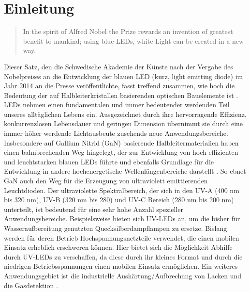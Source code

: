 
\chapter{Einleitung}
\thispagestyle{fancy}

\begin{quote}
In the spirit of Alfred Nobel the Prize rewards an invention of greatest benefit to mankind; using blue LEDs, white Light can be created in a new way.\end{quote}
\noindent
Dieser Satz, den die Schwedische Akademie der Künste nach der Vergabe des Nobelpreises an die Entwicklung der blauen LED (kurz, light emitting diode) im Jahr 2014 an die Presse veröffentlichte, fasst treffend zusammen, wie hoch die Bedeutung der auf Halbleiterkristallen basierenden optischen Bauelemente ist \cite{kneissl}. LEDs nehmen einen fundamentalen und immer bedeutender werdenden Teil unseres alltäglichen Lebens ein. Ausgezeichnet durch ihre hervorragende Effizienz, konkurrenzlosen Lebensdauer und geringen Dimension übernimmt sie durch eine immer höher werdende Lichtausbeute zusehends neue Anwendungsbereiche. Insbesondere auf Gallium Nitrid (GaN) basierende Halbleitermaterialien haben einen bahnbrechenden Weg hingelegt, der zur Entwicklung von hoch effizienten und leuchtstarken blauen LEDs führte und ebenfalls Grundlage für die Entwicklung in andere hochenergetische Wellenlängenbereiche darstellt \cite{risk}. So ebnet GaN auch den Weg für die Erzeugung von ultraviolett emittierenden Leuchtdioden. Der ultraviolette Spektralbereich, der sich in den UV-A (400 nm bis 320 nm), UV-B (320 nm bis 280) und UV-C Bereich (280 nm bis 200 nm) unterteilt, ist bedeutend für eine sehr hohe Anzahl spezieller Anwendungsbereiche. Beispielsweise bieten sich UV-LEDs an, um die bisher für Wasseraufbereitung genutzten Quecksilberdampflampen zu ersetze. Bislang werden für deren Betrieb Hochspannungsnetzteile verwendet, die einen mobilen Einsatz erheblich erschweren können. Hier bietet sich die Möglichkeit Abhilfe durch UV-LEDs zu verschaffen, da diese durch ihr kleines Format und durch die niedrigen Betriebsspannungen einen mobilen Einsatz ermöglichen. Ein weiteres Anwendungsgebiet ist die industrielle Aushärtung/Aufbrechung von Lacken und die Gasdetektion \cite{0268-1242-26-1-014036} \cite{LALINSKY2010152}. 
%
